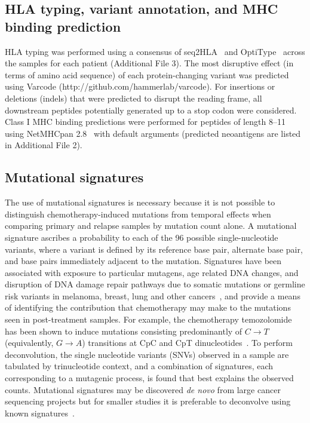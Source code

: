 \subsection*{HLA typing, variant annotation, and MHC binding prediction}
\begin{sloppypar}
HLA typing was performed using a consensus of seq2HLA~\cite{Boegel_2012} and OptiType~\cite{Szolek_2014} across the samples for each patient (Additional File 3). The most disruptive effect (in terms of amino acid sequence) of each protein-changing variant was predicted using Varcode (http://github.com/hammerlab/varcode). For insertions or deletions (indels) that were predicted to disrupt the reading frame, all downstream peptides potentially generated up to a stop codon were considered. Class I MHC binding predictions were performed for peptides of length 8--11 using NetMHCpan 2.8~\cite{Lundegaard_2008} with default arguments (predicted neoantigens are listed in Additional File 2).
\end{sloppypar}

\subsection*{Mutational signatures}
The use of mutational signatures is necessary because it is not possible to distinguish chemotherapy-induced mutations from temporal effects when comparing primary and relapse samples by mutation count alone. A mutational signature ascribes a probability to each of the 96 possible single-nucleotide variants, where a variant is defined by its reference base pair, alternate base pair, and base pairs immediately adjacent to the mutation. Signatures have been associated with exposure to particular mutagens, age related DNA changes, and disruption of DNA damage repair pathways due to somatic mutations or germline risk variants in melanoma, breast, lung and other cancers~\cite{Alexandrov2013}, and provide a means of identifying the contribution that chemotherapy may make to the mutations seen in post-treatment samples. For example, the chemotherapy temozolomide has been shown to induce mutations consisting predominantly of $C \rightarrow T$ (equivalently, $G \rightarrow A$) transitions at CpC and CpT dinucleotides~\cite{Johnson_2013}. To perform deconvolution, the single nucleotide variants (SNVs) observed in a sample are tabulated by trinucleotide context, and a combination of signatures, each corresponding to a mutagenic process, is found that best explains the observed counts. Mutational signatures may be discovered \textit{de novo} from large cancer sequencing projects but for smaller studies it is preferable to deconvolve using known signatures~\cite{Rosenthal_2016}.

